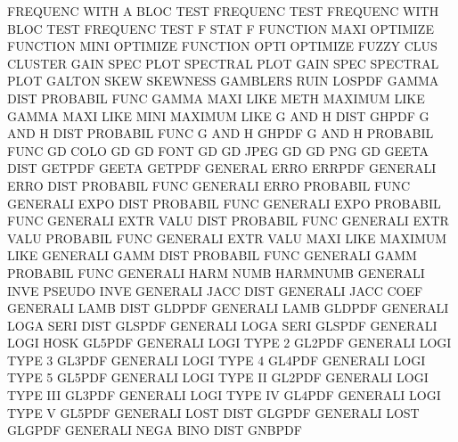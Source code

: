 FREQUENC WITH A    BLOC TEST            FREQUENC TEST
FREQUENC WITH BLOC TEST                 FREQUENC TEST
F        STAT                           F
FUNCTION MAXI                           OPTIMIZE
FUNCTION MINI                           OPTIMIZE
FUNCTION OPTI                           OPTIMIZE
FUZZY    CLUS                           CLUSTER
GAIN     SPEC PLOT                      SPECTRAL PLOT
GAIN     SPEC                           SPECTRAL PLOT
GALTON   SKEW                           SKEWNESS
GAMBLERS RUIN                           LOSPDF
GAMMA    DIST                           PROBABIL FUNC
GAMMA    MAXI LIKE METH                 MAXIMUM  LIKE
GAMMA    MAXI LIKE MINI                 MAXIMUM  LIKE
G        AND  H    DIST                 GHPDF
G        AND  H    DIST                 PROBABIL FUNC
G        AND  H                         GHPDF
G        AND  H                         PROBABIL FUNC
GD       COLO                           GD
GD       FONT                           GD
GD       JPEG                           GD
GD       PNG                            GD
GEETA    DIST                           GETPDF
GEETA                                   GETPDF
GENERAL  ERRO                           ERRPDF
GENERALI ERRO DIST                      PROBABIL FUNC
GENERALI ERRO                           PROBABIL FUNC
GENERALI EXPO DIST                      PROBABIL FUNC
GENERALI EXPO                           PROBABIL FUNC
GENERALI EXTR VALU DIST                 PROBABIL FUNC
GENERALI EXTR VALU                      PROBABIL FUNC
GENERALI EXTR VALU MAXI LIKE            MAXIMUM  LIKE
GENERALI GAMM DIST                      PROBABIL FUNC
GENERALI GAMM                           PROBABIL FUNC
GENERALI HARM NUMB                      HARMNUMB
GENERALI INVE                           PSEUDO   INVE
GENERALI JACC DIST                      GENERALI JACC COEF
GENERALI LAMB DIST                      GLDPDF
GENERALI LAMB                           GLDPDF
GENERALI LOGA SERI DIST                 GLSPDF
GENERALI LOGA SERI                      GLSPDF
GENERALI LOGI HOSK                      GL5PDF
GENERALI LOGI TYPE 2                    GL2PDF
GENERALI LOGI TYPE 3                    GL3PDF
GENERALI LOGI TYPE 4                    GL4PDF
GENERALI LOGI TYPE 5                    GL5PDF
GENERALI LOGI TYPE II                   GL2PDF
GENERALI LOGI TYPE III                  GL3PDF
GENERALI LOGI TYPE IV                   GL4PDF
GENERALI LOGI TYPE V                    GL5PDF
GENERALI LOST DIST                      GLGPDF
GENERALI LOST                           GLGPDF
GENERALI NEGA BINO DIST                 GNBPDF
